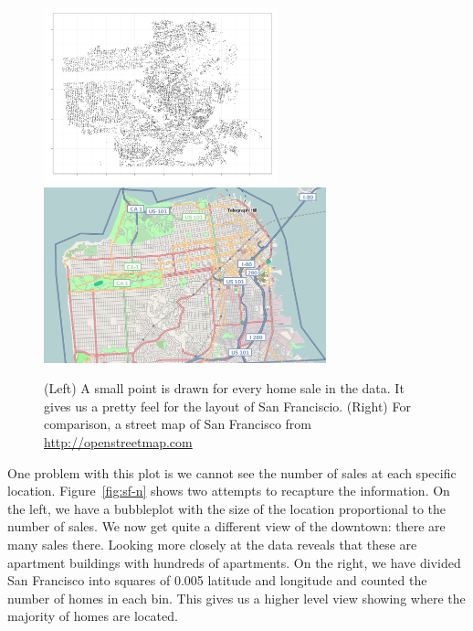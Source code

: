 \documentclass[oneside]{article}
\begin{document}
\begin{figure}[htbp]
  \centering
  \includegraphics[height=2in]{sf-geo}%
  \includegraphics[height=2in]{sf-map}
  \caption{(Left) A small point is drawn for every home sale in the data.  It gives us a pretty feel for the layout of San Franciscio. (Right) For comparison, a street map of San Francisco from \url{http://openstreetmap.com}}
  \label{fig:sf-geo}
\end{figure}

One problem with this plot is we cannot see the number of sales at each specific location. Figure~\ref{fig:sf-n} shows two attempts to recapture the information. On the left, we have a bubbleplot with the size of the location proportional to the number of sales. We now get quite a different view of the downtown: there are many sales there. Looking more closely at the data reveals that these are apartment buildings with hundreds of apartments. On the right, we have divided San Francisco into squares of 0.005 latitude and longitude and counted the number of homes in each bin. This gives us a higher level view showing where the majority of homes are located.
\end{document}

